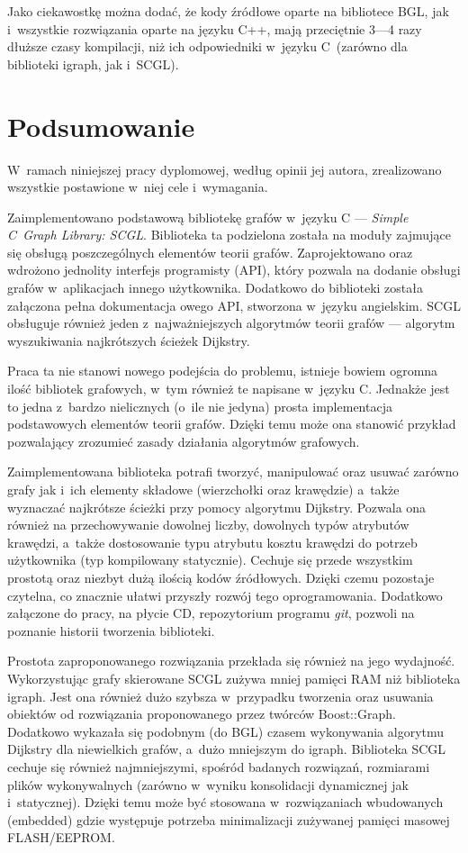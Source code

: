 \documentclass[a4paper,12pt,polish,twoside,openright]{thesis}
\begin{document}
Jako ciekawostkę można dodać, że kody źródłowe oparte na bibliotece BGL, jak i~wszystkie rozwiązania oparte na języku C++, mają przeciętnie 3---4 razy dłuższe czasy kompilacji, niż ich odpowiedniki w~języku C~(zarówno dla biblioteki igraph, jak i~SCGL).


\chapter*{Podsumowanie}
W~ramach niniejszej pracy dyplomowej, według opinii jej autora, zrealizowano wszystkie postawione w~niej cele i~wymagania.

Zaimplementowano podstawową bibliotekę grafów w~języku C --- \emph{Simple C~Graph Library: SCGL}.
Biblioteka ta podzielona została na moduły zajmujące się obsługą poszczególnych elementów teorii grafów.
Zaprojektowano oraz wdrożono jednolity interfejs programisty (API), który pozwala na dodanie obsługi grafów w~aplikacjach innego użytkownika.
Dodatkowo do biblioteki została załączona pełna dokumentacja owego API, stworzona w~języku angielskim.
SCGL obsługuje również jeden z~najważniejszych algorytmów teorii grafów --- algorytm wyszukiwania najkrótszych ścieżek Dijkstry.

Praca ta nie stanowi nowego podejścia do problemu, istnieje bowiem ogromna ilość bibliotek grafowych, w~tym również te napisane w~języku C. Jednakże jest to jedna z~bardzo nielicznych (o~ile nie jedyna) prosta implementacja podstawowych elementów teorii grafów. Dzięki temu może ona stanowić przykład pozwalający zrozumieć zasady działania algorytmów grafowych.

Zaimplementowana biblioteka potrafi tworzyć, manipulować oraz usuwać zarówno grafy jak i~ich elementy składowe (wierzchołki oraz krawędzie) a~także wyznaczać najkrótsze ścieżki przy pomocy algorytmu Dijkstry.
Pozwala ona również na przechowywanie dowolnej liczby, dowolnych typów atrybutów krawędzi, a~także dostosowanie typu atrybutu kosztu krawędzi do potrzeb użytkownika (typ kompilowany statycznie).
Cechuje się przede wszystkim prostotą oraz niezbyt dużą ilością kodów źródłowych.
Dzięki czemu pozostaje czytelna, co znacznie ułatwi przyszły rozwój tego oprogramowania.
Dodatkowo załączone do pracy, na płycie CD, repozytorium programu \emph{git}, pozwoli na poznanie historii tworzenia biblioteki.

Prostota zaproponowanego rozwiązania przekłada się również na jego wydajność.
Wykorzystując grafy skierowane SCGL zużywa mniej pamięci RAM niż biblioteka igraph.
Jest ona również dużo szybsza w~przypadku tworzenia oraz usuwania obiektów od rozwiązania proponowanego przez twórców Boost::Graph.
Dodatkowo wykazała się podobnym (do BGL) czasem wykonywania algorytmu Dijkstry dla niewielkich grafów, a~dużo mniejszym do igraph.
Biblioteka SCGL cechuje się również najmniejszymi, spośród badanych rozwiązań, rozmiarami plików wykonywalnych (zarówno w~wyniku konsolidacji dynamicznej jak i~statycznej).
Dzięki temu może być stosowana w~rozwiązaniach wbudowanych (embedded) gdzie występuje potrzeba minimalizacji zużywanej pamięci masowej FLASH/EEPROM.
\end{document}
